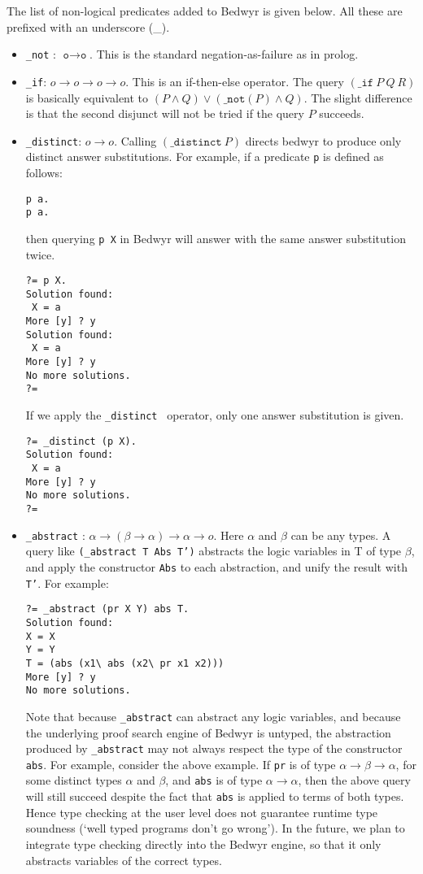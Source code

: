 \documentclass{article}
\newcommand\obj[1]{\texttt{#1}}
\begin{document}
The list of non-logical predicates added to Bedwyr is given below. All these
are prefixed with an underscore (\_). 
\begin{itemize}
\item \texttt{\_not} : $\obj o \to \obj o$. 
  This is the standard negation-as-failure as in prolog.

\item \texttt{\_if}: $o \to o \to o \to o.$
 This is an  if-then-else operator. The query
  $(\obj{\_if} ~ P ~ Q ~ R)$ is basically equivalent to 
  $(P \land Q) \lor (\obj{\_not}(P) \land Q)$.
  The slight difference is that the second disjunct will not be tried if the query
$P$ succeeds.

\item \obj{\_distinct}: $o \to o.$
Calling $(\obj{\_distinct} ~ P)$ directs bedwyr to produce only distinct answer substitutions.
For example, if a predicate \obj{p} is defined as follows:
\begin{verbatim}
p a.
p a. 
\end{verbatim}
then querying \obj{p X} in Bedwyr will answer with the same answer substitution twice. 
\begin{verbatim}
?= p X.
Solution found:
 X = a
More [y] ? y
Solution found:
 X = a
More [y] ? y
No more solutions.
?= 
\end{verbatim}
If we apply the \obj{\_distinct } operator, only one answer substitution is given.
\begin{verbatim}
?= _distinct (p X).
Solution found:
 X = a
More [y] ? y
No more solutions.
?= 
\end{verbatim}

\item \obj{\_abstract} : $\alpha \to (\beta \to \alpha) \to \alpha \to o.$ Here $\alpha$ and $\beta$
can be any types.
A query like \obj{(\_abstract T Abs T')} abstracts the logic variables in T of type $\beta$,
and apply the constructor \obj{Abs} to each abstraction, and unify the result with \obj{T'}.
For example: 
\begin{verbatim}
?= _abstract (pr X Y) abs T.
Solution found:
X = X
Y = Y
T = (abs (x1\ abs (x2\ pr x1 x2)))
More [y] ? y
No more solutions.
\end{verbatim}

Note that because \obj{\_abstract} can abstract any logic variables, and because the underlying
proof search engine of Bedwyr is untyped, the abstraction produced by \obj{\_abstract} may not
always respect the type of the constructor \obj{abs}. For example, consider the above example.
If \obj{pr} is of type  $\alpha \to \beta \to \alpha$, for some distinct types $\alpha$ and $\beta$, 
and \obj{abs} is of type $\alpha \to \alpha$, then the above query will still succeed despite the fact
that \obj{abs} is applied to terms of both types. Hence type checking at the user level does not guarantee
runtime type soundness (`well typed programs don't go wrong'). 
In the future, we plan to integrate type checking directly into the Bedwyr engine, so that 
it only abstracts variables of the correct types. 


\end{itemize}
\end{document}

